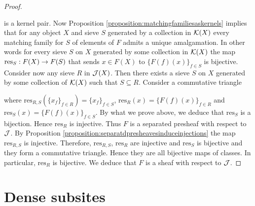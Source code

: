 \begin{proof}
\begin{center}
\end{center}
is a kernel pair. Now Proposition \ref{proposition:matchingfamiliesaskernels} implies that for any object $X$ and sieve $S$ generated by a collection in ${\mathcal K}(X)$ every matching family for $S$ of elements of $F$ admits a unique amalgamation. In other words for every sieve $S$ on $X$ generated by some collection in ${\mathcal K}(X)$ the map $\mathrm{res}_S:F(X)\rightarrow F(S)$ that sends $x\in F(X)$ to $\{F(f)(x)\}_{f\in S}$ is bijective. Consider now any sieve $R$ in ${\mathcal J}(X)$. Then there exists a sieve $S$ on $X$ generated by some collection of ${\mathcal K}(X)$ such that $S\subseteq R$. Consider a commutative triangle
\begin{center}
\end{center}
where $\mathrm{res}_{R,S}\left(\{x_f\}_{f\in R}\right)=\{x_f\}_{f\in S}$, $\mathrm{res}_{R}(x)=\{F(f)(x)\}_{f\in R}$ and $\mathrm{res}_{S}(x)=\{F(f)(x)\}_{f\in S}$. By what we prove above, we deduce that $\mathrm{res}_S$ is a bijection. Hence $\mathrm{res}_R$ is injective. Thus $F$ is a separated presheaf with respect to ${\mathcal J}$. By Proposition \ref{proposition:separatdpresheavesinduceinjections} the map $\mathrm{res}_{R,S}$ is injective. Therefore, $\mathrm{res}_{R,S}$, $\mathrm{res}_R$ are injective and $\mathrm{res}_S$ is bijective and they form a commutative triangle. Hence they are all bijective maps of classes. In particular, $\mathrm{res}_R$ is bijective. We deduce that $F$ is a sheaf with respect to ${\mathcal J}$.
\end{proof}

\section{Dense subsites}

